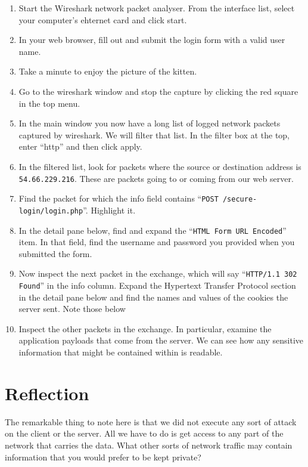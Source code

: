 \documentclass{article}
\begin{document}
\begin{enumerate}
	\item Start the Wireshark network packet analyser. From the interface list, select your computer's ehternet card and click start.
	\item In your web browser, fill out and submit the login form with a valid user name.
	\item Take a minute to enjoy the picture of the kitten.
	\item Go to the wireshark window and stop the capture by clicking the red square in the top menu.
	\item In the main window you now have a long list of logged network packets captured by wireshark. We will filter that list.  In the filter box at the top, enter ``http'' and then click apply. 
	\item In the filtered list, look for packets where the source or destination address is \texttt{54.66.229.216}.  These are packets going to or coming from our web server.
	\item Find the packet for which the info field contains ``\texttt{POST /secure-login/login.php}''. Highlight it.
	\item In the detail pane below, find and expand the ``\texttt{HTML Form URL Encoded}'' item. In that field,
	find the username and password you provided when you submitted the form.
	\item Now inspect the next packet in the exchange, which will say ``\texttt{HTTP/1.1 302 Found}'' in the info column. Expand the Hypertext Transfer Protocol section in the detail pane below and find the names and values of the cookies the server sent.  Note those below
	\vspace{20mm}
	\item Inspect the other packets in the exchange.  In particular, examine the application payloads that come from the server.  We can see how any sensitive information that might be contained within is readable.
\end{enumerate}

\section{Reflection}
The remarkable thing to note here is that we did not execute any sort of attack on the client or the server.  All we have to do is get access to any part of the network that carries the data.  What other sorts of network traffic may contain information that you would prefer to be kept private?
\end{document}
